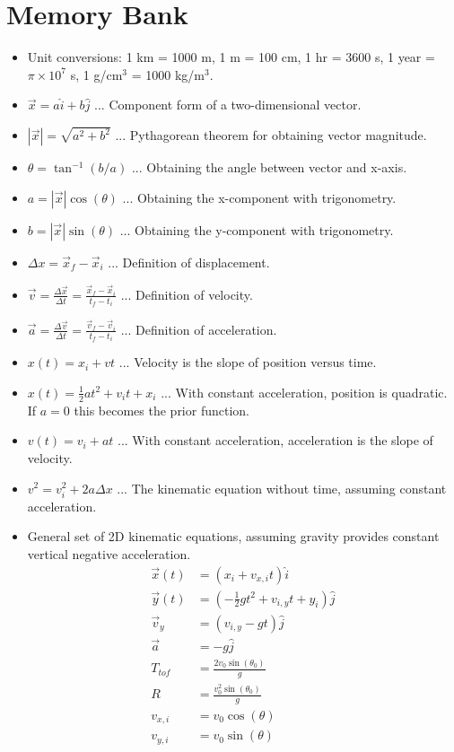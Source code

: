 \documentclass[10pt]{article}
\begin{document}
\maketitle

\section{Memory Bank}

\begin{itemize}
\item Unit conversions: 1 km = 1000 m, 1 m = 100 cm, 1 hr = 3600 s, 1 year = $\pi \times 10^7$ s, 1 g/cm$^3$ = 1000 kg/m$^3$.
\item $\vec{x} = a \hat{i} + b\hat{j}$ ... Component form of a two-dimensional vector.
\item $|\vec{x}| = \sqrt{a^2+b^2}$ ... Pythagorean theorem for obtaining vector magnitude.
\item $\theta = \tan^{-1}(b/a)$ ... Obtaining the angle between vector and x-axis.
\item $a = |\vec{x}|\cos(\theta)$ ... Obtaining the x-component with trigonometry.
\item $b = |\vec{x}|\sin(\theta)$ ... Obtaining the y-component with trigonometry.
\item $\Delta x = \vec{x}_f - \vec{x}_i$ ... Definition of displacement.
\item $\vec{v} = \frac{\Delta \vec{x}}{\Delta t} = \frac{\vec{x}_f - \vec{x}_i}{t_f-t_i}$ ... Definition of velocity.
\item $\vec{a} = \frac{\Delta \vec{v}}{\Delta t} = \frac{\vec{v}_f - \vec{v}_i}{t_f-t_i}$ ... Definition of acceleration.
\item $x(t) = x_i + v t$ ... Velocity is the slope of position versus time.
\item $x(t) = \frac{1}{2} a t^2 + v_i t + x_i$ ... With constant acceleration, position is quadratic.  If $a=0$ this becomes the prior function.
\item $v(t) = v_i + a t$ ... With constant acceleration, acceleration is the slope of velocity.
\item $v^2 = v_i^2 + 2 a \Delta x$ ... The kinematic equation without time, assuming constant acceleration.
\item General set of 2D kinematic equations, assuming gravity provides constant vertical negative acceleration.
\begin{align}
\vec{x}(t) &= (x_i + v_{x,i} t) \hat{i} \\
\vec{y}(t) &= (-\frac{1}{2}g t^2 + v_{i,y} t + y_i) \hat{j} \\
\vec{v}_y &= (v_{i,y} - g t) \hat{j} \\
\vec{a} &= -g \hat{j} \\
T_{tof} &= \frac{2 v_0\sin(\theta_0)}{g} \\
R &= \frac{v_0^2\sin(\theta_0)}{g} \\
v_{x,i} &= v_0 \cos(\theta) \\
v_{y,i} &= v_0 \sin(\theta)
\end{align}
\end{itemize}
\end{document}
